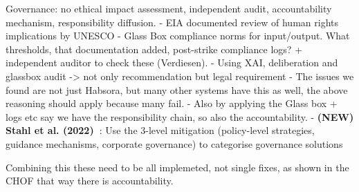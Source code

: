 Governance:
no ethical impact assessment, independent audit, accountability mechanism, responsibility diffusion.
- EIA documented review of human rights implications by UNESCO \cite{unesco2021recommendation}
- Glass Box compliance norms for input/output. What thresholds, that documentation added, post-strike compliance logs? + independent auditor to check these (Verdiesen).\cite{info12090385}
- Using XAI, deliberation and glassbox audit -> not only recommendation but legal requirement \cite{ootlaws}
- The issues we found are not just Habsora, but many other systems have this as well, the above reasoning should apply because many fail.
- Also by applying the Glass box + logs etc \citet{aimag.v40i1.2848} say we have the responsibility chain, so also the accountability. 
- \textbf{(NEW) Stahl et al. (2022)~\citep{stahl2022organisational}}: Use the 3-level mitigation (policy-level strategies, guidance mechanisms, corporate governance) to categorise governance solutions

Combining this these need to be all implemeted, not single fixes, as shown in the CHOF that way there is accountability.